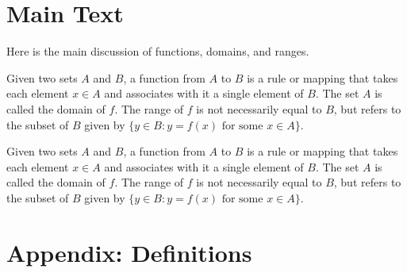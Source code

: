 \documentclass{article}
\newcommand{\appendixdefs}{}
\newcommand{\printappendixdefs}{
    \newpage
    \section*{Appendix: Definitions}
    \appendixdefs
}
\begin{document}
\renewcommand{\theenumi}{\arabic{enumi}}
\renewcommand{\labelenumi}{\theenumi.}
\section{Main Text}

Here is the main discussion of functions, domains, and ranges.

\begin{storedefinition}
    Given two sets \(A\) and \(B\), a function from \(A\) to \(B\) is a rule or mapping that takes each element \(x \in A\) and associates with it a single element of \(B\).
    The set \(A\) is called the domain of \(f\).
    The range of \(f\) is not necessarily equal to \(B\), but refers to the subset of \(B\) given by \(\{y \in B : y = f(x) \text{ for some } x \in A\}\).
\end{storedefinition}
\begin{storedefinition}
    Given two sets \(A\) and \(B\), a function from \(A\) to \(B\) is a rule or mapping that takes each element \(x \in A\) and associates with it a single element of \(B\).
    The set \(A\) is called the domain of \(f\).
    The range of \(f\) is not necessarily equal to \(B\), but refers to the subset of \(B\) given by \(\{y \in B : y = f(x) \text{ for some } x \in A\}\).
\end{storedefinition}

\printappendixdefs
\end{document}

